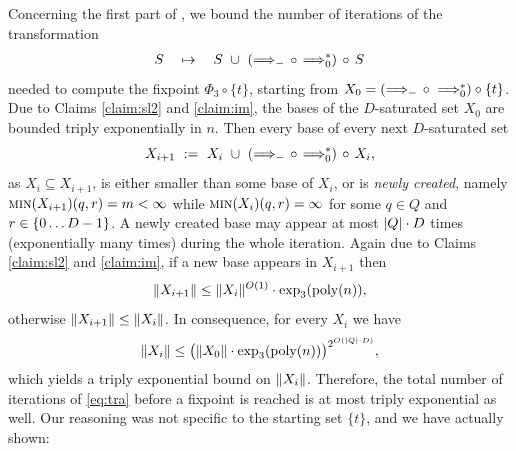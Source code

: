 Concerning the first part of ,
we bound the number of iterations of the transformation
\begin{align}\label{eq:tra}
S \quad \mapsto \quad S \ \cup \ 
    ({\stepp -} \, \circ \, {\stepp{0}^*}) \, \circ \,  S
\end{align}
needed to compute the fixpoint $\Phi_3 \circ \{t\}$, starting from
$X_0 = ({\stepp -} \,\circ\ {\stepp{0}^\ast})  \circ \{t\}$.
Due to Claims \ref{claim:sl2} and \ref{claim:im}, 
the bases of the $D$-saturated 
set $X_0$ are bounded triply exponentially in $n$.
Then every base of every next $D$-saturated set
\[
    X_{i+1} \ := \ X_{i} \ \cup \ 
    ({\stepp -} \,\circ\, {\stepp{0}^\ast}) \, \circ\,  X_{i},
\]
as $X_i \subseteq X_{i+1}$,
is either smaller than some base of $X_i$, or is 
\emph{newly created}, namely
 $\textsc{min}(X_{i+1})(q,r) = m < \infty$ while $\textsc{min}(X_i)(q,r)=\infty$
 for some $q\in Q$ and $r\in\{0\ldots D-1\}$.
 A newly created base may appear at most $|Q| \cdot D$ 
 times (exponentially many times) during the whole iteration.
 Again due to Claims \ref{claim:sl2} and \ref{claim:im},
 if a new base appears in $X_{i+1}$ then
 \[
    \lVert X_{i+1}\rVert \leq \lVert X_i\rVert^{O(1)} \cdot \exp_{3}(\text{poly}(n)),
 \]
 otherwise 
 $\lVert X_{i+1}\rVert \leq \lVert X_i\rVert$.
In consequence, for every $X_i$ we 
have 
\begin{align} \label{eq:3e}
\lVert X_i\rVert \leq \bigl(\lVert X_0\rVert \cdot 
\exp_{3}(\text{poly}(n))\bigr)^{2^{O(|Q| \cdot D)}},
\end{align}
which yields a triply exponential bound on $\lVert X_i\rVert$.
Therefore, the total number of iterations of \eqref{eq:tra} 
before 
a fixpoint is reached is at most triply exponential as well.
Our reasoning was not specific to the starting set $\{t\}$,
and we have actually shown:

